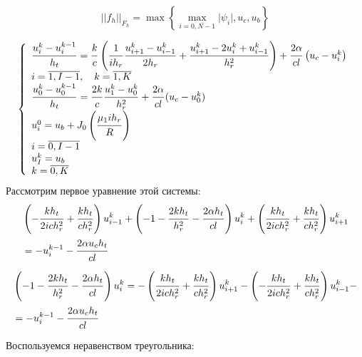 \documentclass[a4paper,12pt,russian, fleqn]{extreport}
\begin{document}
 	\begin{equation*}
 		\lvert\lvert f_h \rvert\rvert_{F_h} = \max\left\{\max\limits_{i=\overline{0, N-1}}\vert \psi_i \vert, u_c, u_b \right\}
 	\end{equation*}
 	
 	\begin{equation*}
 	\left\{\begin{array}{l}
 	\dfrac{\strut u_i^{k}-u_i^{k-1}}{\strut h_t} = \dfrac{\strut k}{\strut c}\left(\dfrac{\strut 1}{\strut ih_r}\dfrac{\strut u_{i+1}^k - u_{i-1}^k}{\strut 2h_r} +\dfrac{\strut u_{i+1}^k - 2u_i^k + u_{i-1}^k}{\strut h^2_r}\right) + \dfrac{\strut 2\alpha}{\strut cl}\left (u_c - u_i^k \right) \\
 	i = \overline{1,I-1}, \quad k = \overline{1,K}	 \\
 	\dfrac{\strut u_0^{k}-u_0^{k-1}}{\strut h_t} = \dfrac{\strut 2k}{\strut c}\dfrac{\strut u_1^k-u_0^k}{\strut h_r^2} + \dfrac{\strut 2\alpha}{\strut cl}(u_c-u_0^k) \\
 	u_i^0 = u_b + J_0\left( \dfrac{\strut \mu_1 ih_r}{\strut R} \right) \\
 	i = \overline{0, I-1} \\
 	u_I^k = u_b \\
 	k = \overline{0,K}
 	\end{array}\right.
 	\end{equation*}
 	Рассмотрим первое уравнение этой системы:
 	\begin{align}
		& \left(-\dfrac{\strut k h_t}{\strut 2ich_r^2} + \dfrac{\strut k h_t}{\strut c h_r^2}\right) u^k_{i-1} + \left(  - 1 - \dfrac{\strut 2 k h_t}{\strut h_r^2} - \dfrac{\strut 2 \alpha h_t}{\strut cl} \right)u^k_i + \left( \dfrac{\strut k h_t}{\strut 2ich_r^2} + \dfrac{\strut k h_t}{\strut c h_r^2} \right) u^k_{i+1} \nonumber \\ 
		& = -u_i^{k-1} - \dfrac{\strut 2\alpha u_c h_t}{\strut cl} 	\nonumber	
 	\end{align}
 	\begin{align}
	 	& \left(  - 1 - \dfrac{\strut 2 k h_t}{\strut h_r^2} - \dfrac{\strut 2 \alpha h_t}{\strut cl} \right)u^k_i = - \left( \dfrac{\strut k h_t}{\strut 2ich_r^2} + \dfrac{\strut k h_t}{\strut c h_r^2} \right) u^k_{i+1} -\left(-\dfrac{\strut k h_t}{\strut 2ich_r^2} + \dfrac{\strut k h_t}{\strut c h_r^2}\right) u^k_{i-1} - \nonumber \\
		& = -u_i^{k-1} - \dfrac{\strut 2\alpha u_c h_t}{\strut cl} 	\nonumber	
 	\end{align}
 	Воспользуемся неравенством треугольника:
\end{document}
